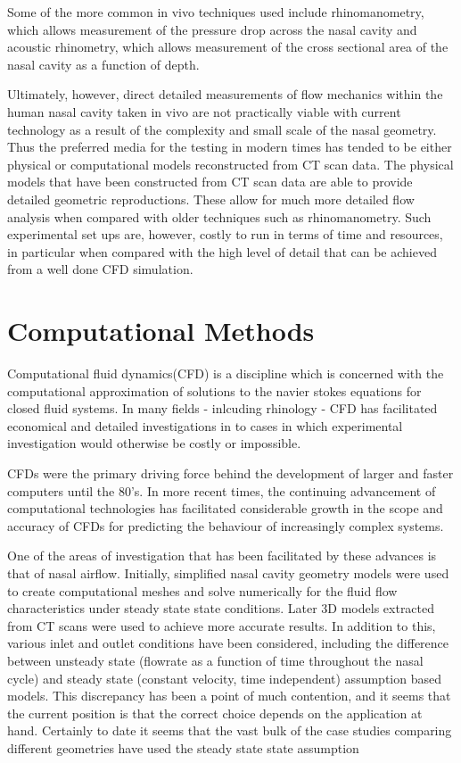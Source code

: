 Some of the more common in vivo techniques used include rhinomanometry, which allows measurement of the pressure drop across the nasal cavity\cite{Hilberg1989} and acoustic rhinometry, which allows measurement of the cross sectional area of the nasal cavity as a function of depth\cite{Hilberg1989}. 

Ultimately, however, direct detailed measurements of flow mechanics within the human nasal cavity taken in vivo are not practically viable with current technology as a result of the complexity and small scale of the nasal geometry\cite{Doorly2008c}. Thus the preferred media for the testing in modern times has tended to be either physical or computational models reconstructed from CT scan data\cite{Doorly2008c}. The physical models that have been constructed from CT scan data are able to provide detailed geometric reproductions. These allow for much more detailed flow analysis when compared with older techniques such as rhinomanometry\cite{Ma2009}. Such experimental set ups are, however, costly to run in terms of time and resources, in particular when compared with the high level of detail that can be achieved from a well done CFD simulation\cite{Ma2009}.

\section{Computational Methods}
Computational fluid dynamics(CFD) is a discipline which is concerned with the computational approximation of solutions to the navier stokes equations for closed fluid systems\cite{Tu2008}. In many fields - inlcuding rhinology - CFD has facilitated economical and detailed investigations in to cases in which experimental investigation would otherwise be costly or impossible\cite{Keyhani1995}.

CFDs were the primary driving force behind the development of larger and faster computers until the 80's\cite{Wendt2009}. In more recent times, the continuing advancement of computational technologies has facilitated considerable growth in the scope and accuracy of CFDs for predicting the behaviour of increasingly complex systems\cite{Tu2008}. 

One of the areas of investigation that has been facilitated by these advances is that of nasal airflow. Initially, simplified nasal cavity geometry models were used to create computational meshes and solve numerically for the fluid flow characteristics under steady state state conditions\cite{Keyhani1995, Hahn1993}. Later 3D models extracted from CT scans were used to achieve more accurate results\cite{Martonen2002}. In addition to this, various inlet and outlet conditions have been considered, including the difference between unsteady state  (flowrate as a function of time throughout the nasal cycle)\cite{Shi2006} and steady state (constant velocity, time independent) assumption based models\cite{Wen2008}. This discrepancy has been a point of much contention, and it seems that the current position is that the correct choice depends on the application at hand\cite{Doorly2008c}. Certainly to date it seems that the vast bulk of the case studies comparing different geometries have used the steady state state assumption\cite{Xi2012, Zhu2011, Garcia2007}

